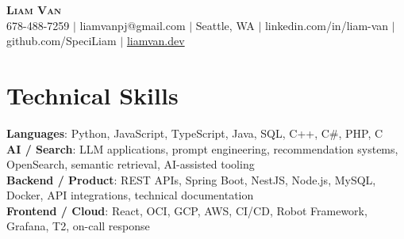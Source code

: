 \documentclass[letterpaper,11pt]{article}
\begin{document}

%
\begin{center}
    \textbf{\Huge \scshape Liam Van} \\ \vspace{1pt}
    \small 678-488-7259 $|$ \small {liamvanpj@gmail.com} $|$ Seattle, WA
 {{$|$ linkedin.com/in/liam-van} {$|$ github.com/SpeciLiam} {$|$ \href{https://liamvan.dev}{liamvan.dev}}}

\end{center}

\section{Technical Skills}
 \begin{itemize}[leftmargin=0.15in, label={}]
    \small{\item{
     \textbf{Languages}{: Python, JavaScript, TypeScript, Java, SQL, C++, C\#, PHP, C} \\
     \textbf{AI / Search}{: LLM applications, prompt engineering, recommendation systems, OpenSearch, semantic retrieval, AI-assisted tooling} \\
     \textbf{Backend / Product}{: REST APIs, Spring Boot, NestJS, Node.js, MySQL, Docker, API integrations, technical documentation} \\
     \textbf{Frontend / Cloud}{: React, OCI, GCP, AWS, CI/CD, Robot Framework, Grafana, T2, on-call response} \\
    }}
 \end{itemize}
%
\end{document}
